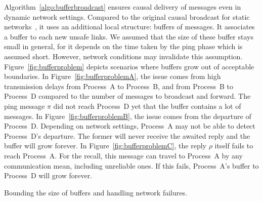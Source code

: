 Algorithm~\ref{algo:bufferbroadcast} ensures causal delivery of messages even in
dynamic network settings. Compared to the original causal broadcast for static
networks~\cite{friedman2004causal}, it uses an additional local structure:
buffers of messages. It associates a buffer to each new unsafe links. We assumed
that the size of these buffer stays small in general, for it depends on the time
taken by the ping phase which is assumed short. However, network conditions may
invalidate this assumption. Figure~\ref{fig:bufferproblem} depicts scenarios
where buffers grow out of acceptable boundaries. In
Figure~\ref{fig:bufferproblemA}, the issue comes from high transmission delays
from Process~A to Process~B, and from Process~B to Process~D compared to the
number of messages to broadcast and forward. The ping message $\pi$ did not
reach Process~D yet that the buffer contains a lot of messages. In
Figure~\ref{fig:bufferproblemB}, the issue comes from the departure of
Process~D. Depending on network settings, Process~A may not be able to detect
Process~D's departure. The former will never receive the awaited reply and the
buffer will grow forever. In Figure~\ref{fig:bufferproblemC}, the reply $\rho$
itself fails to reach Process~A. For the recall, this message can travel to
Process~A by any communication mean, including unreliable ones. If this fails,
Process~A's buffer to Process~D will grow
forever. %

\begin{algorithm}
  
  \caption{\label{algo:boundingbuffer}Bounding the size of buffers and handling
    network failures.}
\end{algorithm}

